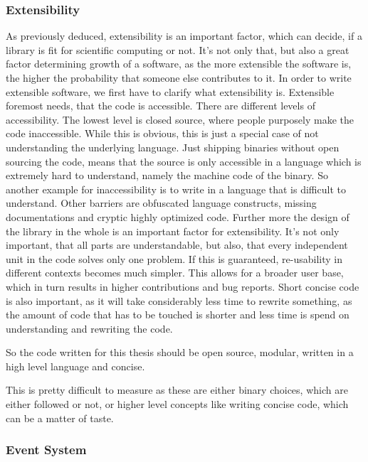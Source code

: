 \subsubsection{Extensibility}
As previously deduced, extensibility is an important factor, which can decide, if a library is fit for scientific computing or not. 
It's not only that, but also a great factor determining growth of a software, as the more extensible the software is, the higher the probability that someone else contributes to it.
In order to write extensible software, we first have to clarify what extensibility is.
Extensible foremost needs, that the code is accessible. There are different levels of accessibility. The lowest level is closed source, where people purposely make the code inaccessible. While this is obvious, this is just a special case of not understanding the underlying language. Just shipping binaries without open sourcing the code, means that the source is only accessible in a language which is extremely hard to understand, namely the machine code of the binary. So another example for inaccessibility is to write in a language that is difficult to understand. Other barriers are obfuscated language constructs, missing documentations and cryptic highly optimized code.
Further more the design of the library in the whole is an important factor for extensibility. It's not only important, that all parts are understandable, but also, that every independent unit in the code solves only one problem.
If this is guaranteed, re-usability in different contexts becomes much simpler. This allows for a broader user base, which in turn results in higher contributions and bug reports.
Short concise code is also important, as it will take considerably less time to rewrite something, as the amount of code that has to be touched is shorter and less time is spend on understanding and rewriting the code.

So the code written for this thesis should be open source, modular, written in a high level language and concise.

This is pretty difficult to measure as these are either binary choices, which are either followed or not, 
or higher level concepts like writing concise code, which can be a matter of taste.

\subsubsection{Event System}

